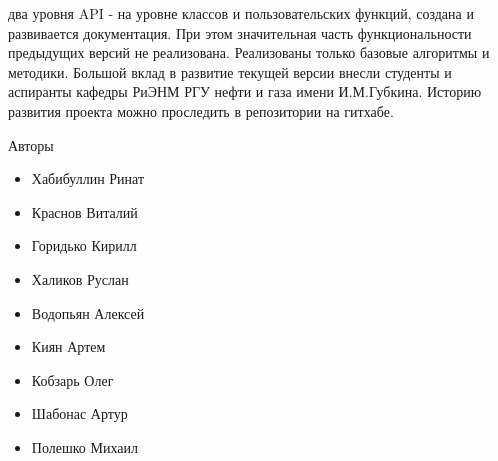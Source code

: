 два уровня API - на уровне классов и пользовательских функций, создана и развивается документация. При этом значительная часть функциональности предыдущих версий не реализована. Реализованы только базовые алгоритмы и методики. Большой вклад в развитие текущей версии внесли студенты и аспиранты кафедры РиЭНМ РГУ нефти и газа имени И.М.Губкина. Историю развития проекта можно проследить в репозитории на гитхабе.

Авторы \unf{}
\begin{itemize}
	\item Хабибуллин Ринат
	\item Краснов Виталий
	\item Горидько Кирилл 
	\item Халиков Руслан
	\item Водопьян Алексей
	\item Киян Артем
	\item Кобзарь Олег
	\item Шабонас Артур 
	\item Полешко Михаил
\end{itemize} 
